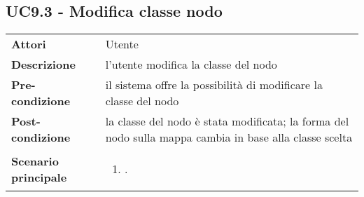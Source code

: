 \subsection{UC9.3 - Modifica classe nodo} 
\label{sssec:UC9.3} 
\def\arraystretch{1.5}
\begin{tabularx}{\textwidth}{l|p{}}
	\rowcolor{I} \multicolumn{2}{c}{\color{white}\textbf{UC9.3 - Modifica classe nodo}} \\
	\toprule
	\endhead
	\textbf{Attori} & Utente\\
	\textbf{Descrizione} & l'utente modifica la classe del nodo\\
	\textbf{Pre-condizione} & il sistema offre la possibilità di modificare la classe del nodo\\
	\textbf{Post-condizione} & la classe del nodo è stata modificata; la forma del nodo sulla mappa cambia in base alla classe scelta\\
	\textbf{Scenario principale} & \vspace{-1.2em}\begin{enumerate}[leftmargin=*,noitemsep,nosep]
		\item \nameref{sssec:UC9.2}.
	\end{enumerate}\\
	\bottomrule
\end{tabularx}
